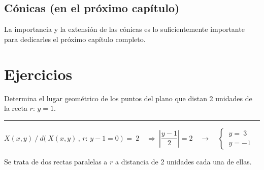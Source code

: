 
\vspace{5mm}

\subsection{Cónicas (en el próximo capítulo)}
\vspace{0.5cm}

La importancia y la extensión de las cónicas es lo suficientemente importante para dedicarles el próximo capítulo completo.

\vspace{1cm}



\section{Ejercicios}
\vspace{0.5cm}

\begin{miejercicio}

Determina el lugar geométrico de los puntos del plano que distan 2 unidades de la recta $r:\, y=1$.

\rule{250pt}{0.5pt}

\vspace{2mm} $X(x,y) \ \big/ \ d \big( \ X(x,y)\, , \, r:\, y-1=0 \ \big) \ = \ 2 \quad \Rightarrow \ \left| \dfrac{y-1}{2} \right| = 2  \quad \to \quad \begin{cases} \ y=\ 3 \\ \ y=-1 \end{cases}$

\vspace{2mm} Se trata de dos rectas paralelas a $r$ a distancia de 2 unidades cada una de ellas.
	
\end{miejercicio}

